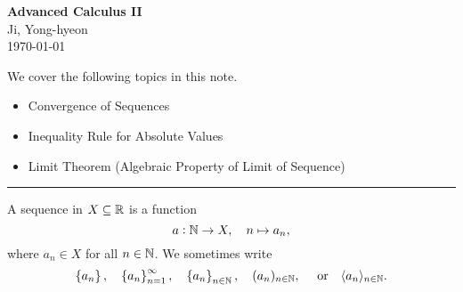 \documentclass[11pt,openany]{article}
\begin{document}
\begin{center}
	\huge\textbf{Advanced Calculus II}\\
	\vspace{0.5em}
	\large{Ji, Yong-hyeon}\\
	\vspace{0.5em}
	\normalsize{\today}\\
\end{center}

\noindent 
We cover the following topics in this note.
\begin{itemize}
	\item Convergence of Sequences
	\item Inequality Rule for Absolute Values
	\item Limit Theorem (Algebraic Property of Limit of Sequence)
\end{itemize}
\hrule\vspace{12pt}

\vspace{20pt}
\begin{remark*}
A sequence in $X\subseteq\mathbb{R}$ is a function \[
a:\mathbb{N}\to X,\quad n\mapsto a_n,
\] where $a_n\in X$ for all $n\in\mathbb{N}$. We sometimes write \[
\set{a_n},\quad\set{a_n}_{n=1}^\infty,\quad \set{a_n}_{n\in\mathbb{N}},\quad (a_n)_{n\in\mathbb{N}},\quad\ \text{or}\quad \langle a_n \rangle_{n\in\mathbb{N}}.
\]
\end{remark*}
\end{document}
